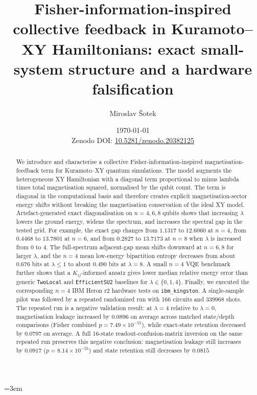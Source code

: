 \documentclass[preprint,aps,physrev,superscriptaddress,floatfix,longbibliography]{revtex4-2}
\newcommand{\paperdoi}{Zenodo DOI: \href{https://doi.org/10.5281/zenodo.20382125}{10.5281/zenodo.20382125}}
\begin{document}
\emergencystretch=3em

\title{Fisher-information-inspired collective feedback in Kuramoto--XY
Hamiltonians: exact small-system structure and a hardware falsification}

\author{Miroslav \v{S}otek}

\date{\today\\\paperdoi}

\begin{abstract}
We introduce and characterise a collective Fisher-information-inspired
magnetisation-feedback term for Kuramoto--XY quantum simulations. The model
augments the heterogeneous XY Hamiltonian with a diagonal term proportional to
minus lambda times total magnetisation squared, normalised by the qubit count.
The term is diagonal in the
computational basis and therefore creates explicit magnetisation-sector energy
shifts without breaking the magnetisation conservation of the ideal XY
model. Artefact-generated exact diagonalisation on $n=4,6,8$ qubits shows that
increasing $\lambda$ lowers the ground energy, widens the spectrum, and
increases the spectral gap in the tested grid. For example, the exact gap
changes from $1.1317$ to $12.6060$ at $n=4$, from $0.4468$ to $13.7801$ at
$n=6$, and from $0.2827$ to $13.7173$ at $n=8$ when $\lambda$ is increased
from $0$ to $4$. The full-spectrum adjacent-gap mean shifts downward at
$n=6,8$ for larger $\lambda$, and the $n=4$ mean low-energy bipartition
entropy decreases from about $0.676$ bits at $\lambda\leq 1$ to about
$0.490$ bits at $\lambda=8$. A small $n=4$ VQE benchmark further shows that a
$K_{ij}$-informed ansatz gives lower median relative energy error than generic
\texttt{TwoLocal} and \texttt{EfficientSU2} baselines for
$\lambda\in\{0,1,4\}$. Finally, we executed the corresponding $n=4$ IBM Heron
r2 hardware tests on \texttt{ibm\_kingston}. A single-sample pilot was followed
by a repeated randomized run with 166 circuits and 339968 shots. The repeated
run is a negative validation result: at $\lambda=4$ relative to $\lambda=0$,
magnetisation leakage increased by $0.0896$ on average across matched
state/depth comparisons (Fisher combined $p=7.49\times10^{-55}$), while
exact-state retention decreased by $0.0797$ on average. A full 16-state
readout-confusion-matrix inversion on the same repeated run preserves this
negative conclusion: magnetisation leakage still increases by $0.0917$
($p=8.14\times10^{-55}$) and state retention still decreases by $0.0815$

\end{abstract}
\end{document}
